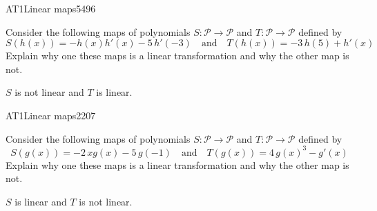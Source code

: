 \begin{exercise}{AT1}{Linear maps}{5496} 
\begin{exerciseStatement} 

 Consider the following maps of polynomials \(S:\mathcal{P}\rightarrow\mathcal{P}\) and \(T:\mathcal{P}\rightarrow\mathcal{P}\) defined by \[
            S(h(x))=
                    -h\left(x\right) h'\left(x\right) - 5 \, h'\left(-3\right)
                \hspace{1em} \text{and} \hspace{1em}
            T(h(x))=
                    -3 \, h\left(5\right) + h'\left(x\right)
        \] Explain why one these maps is a linear transformation and why the other map is not. 

 \end{exerciseStatement}
 \begin{exerciseAnswer} 

\(S\) is not linear and \(T\) is linear.

 \end{exerciseAnswer}
 \end{exercise}


\begin{exercise}{AT1}{Linear maps}{2207} 
\begin{exerciseStatement} 

 Consider the following maps of polynomials \(S:\mathcal{P}\rightarrow\mathcal{P}\) and \(T:\mathcal{P}\rightarrow\mathcal{P}\) defined by \[
            S(g(x))=
                    -2 \, x g\left(x\right) - 5 \, g\left(-1\right)
                \hspace{1em} \text{and} \hspace{1em}
            T(g(x))=
                    4 \, g\left(x\right)^{3} - g'\left(x\right)
        \] Explain why one these maps is a linear transformation and why the other map is not. 

 \end{exerciseStatement}
 \begin{exerciseAnswer} 

\(S\) is linear and \(T\) is not linear.

 \end{exerciseAnswer}
 \end{exercise}



